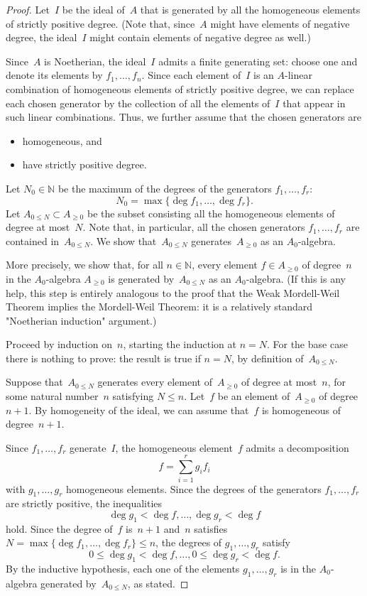 \documentclass{amsart}
\newcommand{\N}{\mathbb{N}}
\newcommand{\Az}{A_{\geq0}}
\newcommand{\An}{A_{0\leq N}}
\begin{document}
\begin{proof}
Let~$I$ be the ideal of~$A$ that is generated by all the homogeneous elements of strictly positive degree.  (Note that, since~$A$ might have elements of negative degree, the ideal~$I$ might contain elements of negative degree as well.)

Since~$A$ is Noetherian, the ideal~$I$ admits a finite generating set: choose one and denote its elements by $f_1, \ldots , f_n$.  Since each element of~$I$ is an $A$-linear combination of homogeneous elements of strictly positive degree, we can replace each chosen generator by the collection of all the elements of~$I$ that appear in such linear combinations.  Thus, we further assume that the chosen generators are
\begin{itemize}
\item
homogeneous, and
\item
have strictly positive degree.
\end{itemize}
Let $N_0 \in \N$ be the maximum of the degrees of the generators $f_1, \ldots , f_r$:
\[
N_0 = \max \{ \deg f_1 , \ldots , \deg f_r \}.
\]
Let $\An \subset \Az$ be the subset consisting all the homogeneous elements of degree at most~$N$.  Note that, in particular, all the chosen generators $f_1, \ldots , f_r$ are contained in~$\An$.  We show that~$\An$ generates~$\Az$ as an $A_0$-algebra.

More precisely, we show that, for all $n \in \N$, every element $f \in \Az$ of degree~$n$ in the $A_0$-algebra $\Az$ is generated by~$\An$ as an $A_0$-algebra. (If this is any help, this step is entirely analogous to the proof that the Weak Mordell-Weil Theorem implies the Mordell-Weil Theorem: it is a relatively standard "Noetherian induction" argument.)

Proceed by induction on~$n$, starting the induction at $n = N$.  For the base case there is nothing to prove: the result is true if $n = N$, by definition of~$\An$.

Suppose that~$\An$ generates every element of~$\Az$ of degree at most~$n$, for some natural number~$n$ satisfying $N \le n$.  Let~$f$ be an element of~$\Az$ of degree $n+1$.  By homogeneity of the ideal, we can assume that~$f$ is homogeneous of degree~$n+1$.

Since $f_1, \ldots, f_r$ generate~$I$, the homogeneous element~$f$ admits a decomposition
\[
f = \sum_{i = 1}^r g_i f_i
\]
with $g_1, \ldots, g_r$ homogeneous elements.  Since the degrees of the generators $f_1, \ldots , f_r$ are strictly positive, the inequalities
\[
\deg g_1 < \deg f, \ldots , \deg g_r < \deg f
\]
hold.  Since the degree of~$f$ is~$n+1$ and~$n$ satisfies $N = \max \{\deg f_1 , \ldots , \deg f_r \} \le n$, the degrees of $g_1, \ldots , g_r$ satisfy
\[
0 \le \deg g_1 < \deg f, \ldots , 0 \le \deg g_r < \deg f.
\]
By the inductive hypothesis, each one of the elements $g_1, \ldots , g_r$ is in the $A_0$-algebra generated by~$\An$, as stated.


\end{proof}
\end{document}
